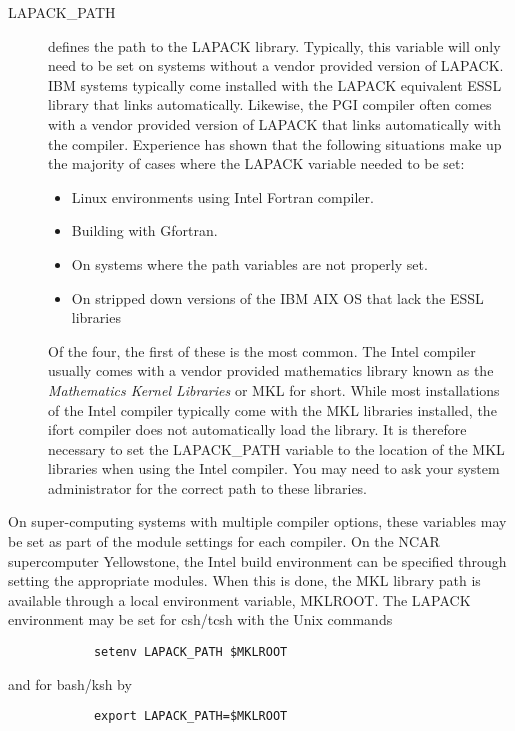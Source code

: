 \begin{description}
\item[LAPACK\_PATH] defines the path to the LAPACK library. Typically, this variable will only need to be set on systems without a vendor provided version of LAPACK.
IBM systems typically come installed with the LAPACK equivalent ESSL library that links automatically. Likewise, the PGI compiler often comes with a vendor provided version of LAPACK that links automatically with the compiler. Experience has shown that the following situations make up the majority of cases where the LAPACK variable needed to be set:
\begin{itemize}
\item Linux environments using Intel Fortran compiler.
\item Building with Gfortran.
\item On systems where the path variables are not properly set.
\item On stripped down versions of the IBM AIX OS that lack the  ESSL libraries
\end{itemize}
Of the four, the first of these is the most common. The Intel compiler usually comes with a vendor provided mathematics library known as the \textit{Mathematics Kernel Libraries} or MKL for short. While most installations of the Intel compiler typically come with the MKL libraries installed, the ifort compiler does not automatically load the library. It is therefore necessary to set the LAPACK\_PATH variable to the location of the MKL libraries when using the Intel compiler. You may need to ask your system administrator for the correct path to these libraries.
\end{description}

On super-computing systems with multiple compiler options, these variables may be set as part of the module settings for each compiler. On the NCAR supercomputer Yellowstone, the Intel build environment can be specified through setting the appropriate modules. When this is done, the MKL library path is available through a local environment variable, MKLROOT. The LAPACK environment may be set for csh/tcsh with the Unix commands
\begin{small}
\begin{verbatim}
            setenv LAPACK_PATH $MKLROOT
\end{verbatim}
\end{small}
and for bash/ksh by
\begin{small}
\begin{verbatim}
            export LAPACK_PATH=$MKLROOT
\end{verbatim}
\end{small}

